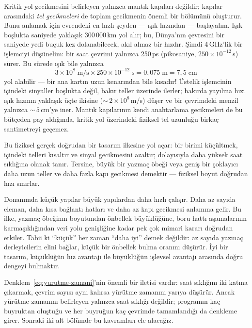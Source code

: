 Kritik yol gecikmesini belirleyen yalnızca mantık kapıları değildir; kapılar arasındaki \emph{tel gecikmeleri} de toplam gecikmenin önemli bir bölümünü oluşturur. Bunu anlamak için evrendeki en hızlı şeyden --- ışık hızından --- başlayalım. Işık boşlukta saniyede yaklaşık 300\,000\,km yol alır; bu, Dünya'nın çevresini bir saniyede yedi buçuk kez dolanabilecek, akıl almaz bir hızdır. Şimdi 4\,GHz'lik bir işlemciyi düşünelim: bir saat çevrimi yalnızca 250\,ps (pikosaniye, $250 \times 10^{-12}$\,s) sürer. Bu sürede ışık bile yalnızca
%
\[
3 \times 10^{8}\;\text{m/s} \times 250 \times 10^{-12}\;\text{s} = 0{,}075\;\text{m} = 7{,}5\;\text{cm}
\]
%
yol alabilir --- bir ana kartın uzun kenarından bile kısadır! Üstelik işlemcinin içindeki sinyaller boşlukta değil, bakır teller üzerinde ilerler; bakırda yayılma hızı ışık hızının yaklaşık üçte ikisine (${\sim}\,2 \times 10^{8}$\,m/s) düşer ve bir çevrimdeki menzil yalnızca ${\sim}\,5$\,cm'ye iner. Mantık kapılarının kendi anahtarlama gecikmeleri de bu bütçeden pay aldığında, kritik yol üzerindeki fiziksel tel uzunluğu birkaç santimetreyi geçemez.

Bu fiziksel gerçek doğrudan bir tasarım ilkesine yol açar: bir birimi küçültmek, içindeki telleri kısaltır ve sinyal gecikmesini azaltır; dolayısıyla daha yüksek saat sıklığına olanak tanır. Tersine, büyük bir yazmaç öbeği veya geniş bir çoklayıcı daha uzun teller ve daha fazla kapı gecikmesi demektir --- fiziksel boyut doğrudan hızı sınırlar.

\begin{tanim}
Donanımda küçük yapılar büyük yapılardan daha hızlı çalışır. Daha az sayıda eleman, daha kısa bağlantı hatları ve daha az kapı gecikmesi anlamına gelir. Bu ilke, yazmaç öbeğinın boyutundan önbellek büyüklüğüne, boru hattı aşamalarının karmaşıklığından veri yolu genişliğine kadar pek çok mimari kararı doğrudan etkiler. Tabii ki ``küçük'' her zaman ``daha iyi'' demek değildir: az sayıda yazmaç derleyicilerin elini bağlar, küçük bir önbellek bulma oranını düşürür. İyi bir tasarım, küçüklüğün hız avantajı ile büyüklüğün işlevsel avantajı arasında doğru dengeyi bulmaktır.
\end{tanim}

Denklem~\ref{eq:yurutme-zamani}'nin önemli bir iletisi vardır: saat sıklığını iki katına çıkarmak, çevrim sayısı aynı kalırsa yürütme zamanını yarıya düşürür. Ancak yürütme zamanını belirleyen yalnızca saat sıklığı değildir; programın kaç buyruktan oluştuğu ve her buyruğun kaç çevrimde tamamlandığı da denkleme girer. Sonraki iki alt bölümde bu kavramları ele alacağız.


